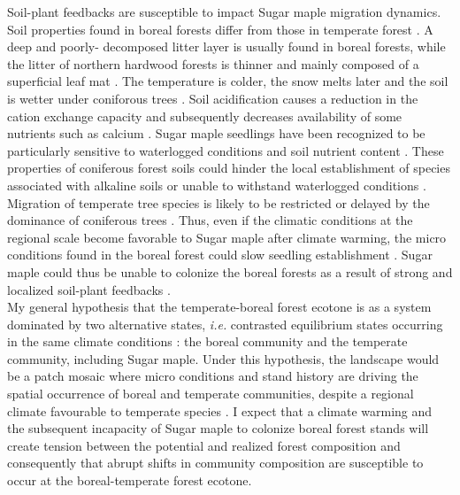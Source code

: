 Soil-plant feedbacks are susceptible to impact Sugar maple migration dynamics.
Soil properties found in boreal forests differ from those in temperate forest
\cite{Lafleur2010,Barras1998,Goldblum2010,Demers1998}. A deep and poorly-
decomposed litter layer is usually found in boreal forests, while the litter
of  northern hardwood forests is thinner and mainly composed of a superficial
leaf mat \cite{Barras1998}. The temperature is colder, the snow melts later
and the soil is wetter under coniforous trees \cite{Lafleur2010,Goldblum2010}.
Soil acidification causes a reduction in the cation exchange capacity and
subsequently decreases availability of some nutrients such as calcium
\cite{Moore2008}. Sugar maple seedlings have been recognized to be
particularly sensitive to waterlogged conditions and soil nutrient content
\cite{Moore2008,Lafleur2010,Cleavitt2011}. These properties of coniferous
forest soils could hinder the local establishment of species associated with
alkaline soils or unable to withstand waterlogged conditions
\cite{Lafleur2010}. Migration of temperate tree species is likely to be
restricted or delayed by the dominance of coniferous trees \cite{Lafleur2010}.
Thus, even if the climatic conditions at the regional scale become favorable
to Sugar maple after climate warming, the micro conditions found in the boreal
forest could slow seedling establishment
\cite{Kellman2004,Moore2008,Barras1998,Messier2011}. Sugar maple could thus be
unable to colonize the boreal forests as a result of strong and localized
soil-plant feedbacks \cite{McCarthyNeumann2012}.\\

My general hypothesis that the temperate-boreal forest ecotone is as a system
dominated by two alternative states, \textit{i.e.} contrasted equilibrium
states occurring in the same climate conditions \cite{scheffer2009critical}:
the boreal community and the temperate community, including Sugar maple. Under
this hypothesis, the landscape would be a patch mosaic where micro conditions
and stand history are driving the spatial occurrence of boreal and temperate
communities, despite a regional climate favourable to temperate species
\cite{Goldblum2010,Fisichelli2013}. I expect that a climate warming and the
subsequent incapacity of Sugar maple to colonize boreal forest stands will
create  tension between the potential and realized forest composition and
consequently that abrupt shifts in community composition are susceptible to
occur at the boreal-temperate forest ecotone.\\

